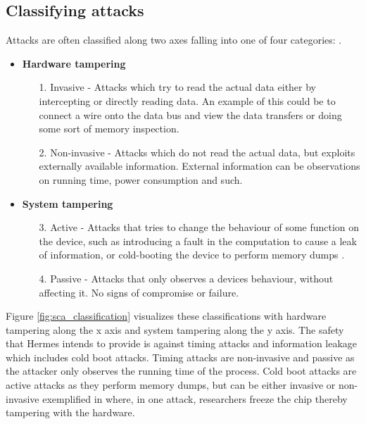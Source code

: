 \subsection{Classifying attacks}
Attacks are often classified along two axes falling into one of four categories: \cite{FX2010}.

\begin{itemize}
  \item \textbf{Hardware tampering}
    \begin{itemize}
      \item[1.] Invasive - Attacks which try to read the actual data either by intercepting or directly reading data. An example of this could be to connect a wire onto the data bus and view the data transfers or doing some sort of memory inspection.
      \item[2.] Non-invasive - Attacks which do not read the actual data, but exploits externally available information. External information can be observations on running time, power consumption and such.
    \end{itemize}
  \item \textbf{System tampering}
    \begin{itemize}
      \item[3.] Active - Attacks that tries to change the behaviour of some function on the device, such as introducing a fault in the computation to cause a leak of information, or cold-booting the device to perform memory dumps \cite{Halderman2008LestKeys}.
      \item[4.] Passive - Attacks that only observes a devices behaviour, without affecting it. No signs of compromise or failure.
    \end{itemize}
\end{itemize}

Figure \ref{fig:sca_classification} visualizes these classifications with hardware tampering along the x axis and system tampering along the y axis.
The safety that Hermes intends to provide is against timing attacks and information leakage which includes cold boot attacks.
Timing attacks are non-invasive and passive as the attacker only observes the running time of the process.
Cold boot attacks are active attacks as they perform memory dumps, but can be either invasive or non-invasive exemplified in \cite{Halderman2008LestKeys} where, in one attack, researchers freeze the chip thereby tampering with the hardware.

